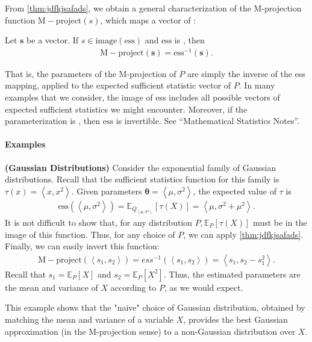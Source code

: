 \documentclass{article}
\newcommand{\bfs}[1]{\textbf{({#1}) }}
\begin{document}
From \cref{thm:jdfkjsafads}, we  obtain a general characterization of the M-projection function $\mathrm{M-project}(s)$, which maps a vector of :
\begin{cora}
 Let $\boldsymbol{s}$ be a vector. If $s \in \mathrm{image}(\mathrm{ess})$ and $\mathrm{ess}$ is , then
\begin{align*}
\mathrm{M-project}(\boldsymbol{s})=\mathrm{ess}^{-1}(\boldsymbol{s}).
\end{align*}
\end{cora}
\begin{rema}That is, the parameters of the M-projection of $P$ are simply the inverse of the ess mapping, applied to the expected sufficient statistic vector of $P$. In many examples that we consider, the image of ess includes all possible vectors of expected sufficient statistics we might encounter. Moreover, if the parameterization is , then $\mathrm{ess}$  is invertible. See ``Mathematical Statistics Notes''.
\end{rema}


\paragraph{Examples}
\begin{exma}\bfs{Gaussian Distributions}
Consider the exponential family of Gaussian distributions. Recall that the sufficient statistics function for this family is $\tau(x)=\left\langle x, x^{2}\right\rangle$. Given parameters $\boldsymbol{\theta}=\left\langle\mu, \sigma^{2}\right\rangle$, the expected value of $\tau$ is
\begin{align*}
\mathrm{ess}\left(\left\langle\mu, \sigma^{2}\right\rangle\right)=\mathbb{E}_{Q_{\left\langle\mu, \sigma^{2}\right\rangle}}[\tau(X)]=\left\langle\mu, \sigma^{2}+\mu^{2}\right\rangle .
\end{align*}
It is not difficult to show that, for any distribution $P, \mathbb{E}_{P}[\tau(X)]$ must be in the image of this function. Thus, for any choice of $P$, we can apply \cref{thm:jdfkjsafads}.
Finally, we can easily invert this function:
\begin{align*}
\mathrm{M-project}\left(\left\langle s_{1}, s_{2}\right\rangle\right)=e s s^{-1}\left(\left\langle s_{1}, s_{2}\right\rangle\right)=\left\langle s_{1}, s_{2}-s_{1}^{2}\right\rangle .
\end{align*}
Recall that $s_{1}=\mathbb{E}_{P}[X]$ and $s_{2}=\mathbb{E}_{P}\left[X^{2}\right]$. Thus, the estimated parameters are the mean and variance of $X$ according to $P$, as we would expect.
\end{exma}
\begin{rema}
This example shows that the "naive" choice of Gaussian distribution, obtained by matching the mean and variance of a variable $X$, provides the best Gaussian approximation (in the M-projection sense) to a non-Gaussian distribution over $X$.
\end{rema}
\end{document}
